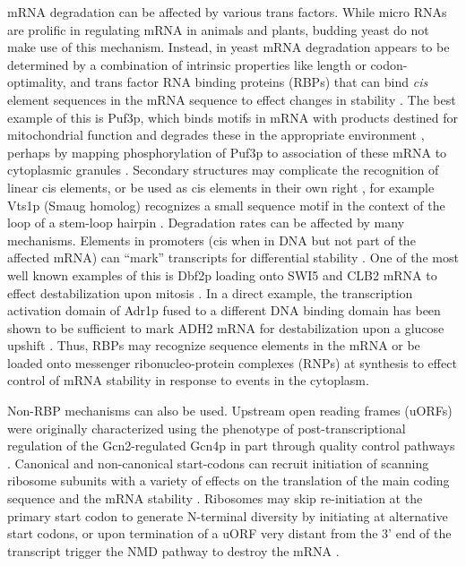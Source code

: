 mRNA
degradation can be affected by various trans factors. While micro RNAs
are prolific in regulating mRNA in animals and plants, budding yeast
do not make use of this mechanism. Instead, in yeast mRNA degradation
appears to be determined by a combination of intrinsic properties like
length or codon-optimality, and trans factor RNA binding proteins
(RBPs) that can bind \textit{cis} element sequences in the mRNA sequence to
effect changes in stability 
\parencite{li2010predicting,cheng2017cis}. The best
example of this is Puf3p, which binds motifs in mRNA with products
destined for mitochondrial function and degrades these in the
appropriate environment 
\parencite{olivas2000puf3,miller2013carbon}, perhaps by
mapping phosphorylation of Puf3p to association of these mRNA to
cytoplasmic granules 
\parencite{lee2015glucose}. Secondary structures may
complicate the recognition of linear cis elements, or be used as cis
elements in their own right \parencite{li2010predicting},
for example Vts1p (Smaug homolog) recognizes a small sequence 
motif in the context of the loop of a stem-loop hairpin 
\parencite{she2017comprehensive,aviv2003rna}.
Degradation rates can be affected by many mechanisms. Elements in
promoters (cis when in DNA but not part of the affected mRNA) can
“mark” transcripts for differential stability 
\parencite{haimovich2013gene}.
One of the most well known examples of this is Dbf2p loading onto SWI5
and CLB2 mRNA to effect destabilization upon mitosis 
\parencite{trcek2011single}. 
In a direct example, the transcription activation domain of
Adr1p fused to a different DNA binding domain has been shown to be
sufficient to mark ADH2 mRNA for destabilization upon a glucose
upshift \parencite{braun2016snf1}.
Thus, RBPs may recognize sequence
elements in the mRNA or be loaded onto messenger ribonucleo-protein
complexes (RNPs) at synthesis 
\parencite{gupta2016translational}
to effect control of
mRNA stability in response to events in the cytoplasm.  

Non-RBP
mechanisms can also be used. Upstream open reading frames (uORFs) were
originally characterized using the phenotype of post-transcriptional
regulation of the Gcn2-regulated Gcn4p 
\parencite{dever1992phosphorylation}
in part through quality control pathways 
\parencite{ruiz1996utilizing}.
Canonical and non-canonical start-codons can recruit initiation of
scanning ribosome subunits with a variety of effects on the
translation of the main coding sequence and the mRNA stability
\parencite{spealman2017conserved}. Ribosomes may skip re-initiation at the
primary start codon to generate N-terminal diversity by initiating at
alternative start codons, or upon termination of a uORF very distant
from the 3' end of the transcript trigger the NMD pathway to destroy
the mRNA \parencite{dever2016mechanism}. 

